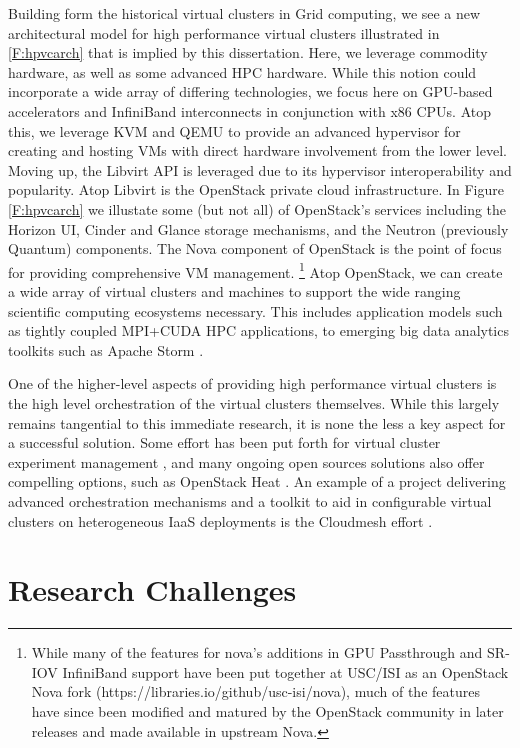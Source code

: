 Building form the historical virtual clusters in Grid computing, we see a new architectural model for high performance virtual clusters illustrated in \ref{F:hpvcarch} that is implied by this dissertation.  Here, we leverage commodity hardware, as well as some advanced HPC hardware. While this notion could incorporate a wide array of differing technologies, we focus here on GPU-based accelerators and InfiniBand interconnects in conjunction with x86 CPUs. Atop this, we leverage KVM and QEMU to provide an advanced hypervisor for creating and hosting VMs with direct hardware involvement from the lower level. Moving up, the Libvirt API is leveraged due to its hypervisor interoperability and popularity. Atop Libvirt is the OpenStack private cloud infrastructure. In Figure \ref{F:hpvcarch} we illustate some (but not all) of OpenStack's services including the Horizon UI, Cinder and Glance storage mechanisms, and the Neutron (previously Quantum) components. The Nova component of OpenStack is the point of focus for providing comprehensive VM management.
\footnote{While many of the features for nova's additions in GPU Passthrough and SR-IOV InfiniBand support have been put together at USC/ISI as an OpenStack Nova fork (https://libraries.io/github/usc-isi/nova), much of the features have since been modified and matured by the OpenStack community in later releases and made available in upstream Nova.}  Atop OpenStack, we can create a wide array of virtual clusters and machines to support the wide ranging scientific computing ecosystems necessary. This includes application models such as tightly coupled MPI+CUDA HPC applications, to emerging big data analytics toolkits such as Apache Storm \cite{kamburugamuve2016streaming}. 

One of the higher-level aspects of providing high performance virtual clusters is the high level orchestration of the virtual clusters themselves. While this largely remains tangential to this immediate research, it is none the less a key aspect for a successful solution. Some effort has been put forth for virtual cluster experiment management \cite{las2010gce}, and many ongoing open sources solutions also offer compelling options, such as OpenStack Heat \cite{www-openstack-heat}.  An example of a project delivering advanced orchestration mechanisms and a toolkit to aid in configurable virtual clusters on heterogeneous IaaS deployments is the Cloudmesh effort \cite{von2014cloudmesh}.  


\section{Research Challenges}
\label{sec:chall}

